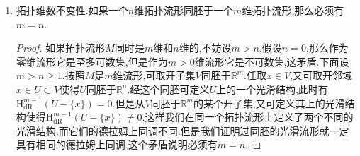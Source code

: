 \begin{enumerate}
\begin{proof}
    	因为$U$是开集,可选取$x$为中心的$n-1$维球面$S$使得$S\subset U-\{x\}$,取包含映射$i:S\subset U-\{x\}$,取射线投影映射$r:U-\{x\}\to S$,它们都是光滑映射,并且有$r\circ i=\mathrm{id}_S$,导致有同调群上同态的关系$i^*\circ r^*=\mathrm{id}$,这说明$r^*:\mathrm{H}^{n-1}_{\mathrm{dR}}(S)\to\mathrm{H}^{n-1}_{\mathrm{dR}}(U-\{x\})$是单射,但是源端非平凡的,所以终端非平凡.
    \end{proof}
    \item 拓扑维数不变性.如果一个$n$维拓扑流形同胚于一个$m$维拓扑流形,那么必须有$m=n$.
    \begin{proof}
    	
    	如果拓扑流形$M$同时是$m$维和$n$维的,不妨设$m>n$,假设$n=0$,那么作为零维流形它是至多可数集,但是作为$m>0$维流形它是不可数集,这矛盾.下面设$m>n\ge1$.按照$M$是$m$维流形,可取开子集$V$同胚于$\mathbb{R}^m$.任取$x\in V$,又可取开邻域$x\in U\subset V$使得$U$同胚于$\mathbb{R}^n$.经这个同胚可定义$U$上的一个光滑结构,此时有$\mathrm{H}^{m-1}_{\mathrm{dR}}(U-\{x\})=0$.但是从$V$同胚于$\mathbb{R}^m$的某个开子集,又可定义其上的光滑结构使得$\mathrm{H}^{m-1}_{\mathrm{dR}}(U-\{x\})\not=0$.这样我们在同一个拓扑流形上定义了两个不同的光滑结构,而它们的德拉姆上同调不同.但是我们证明过同胚的光滑流形就一定具有相同的德拉姆上同调,这个矛盾说明必须有$m=n$.
    \end{proof}
\end{enumerate}

